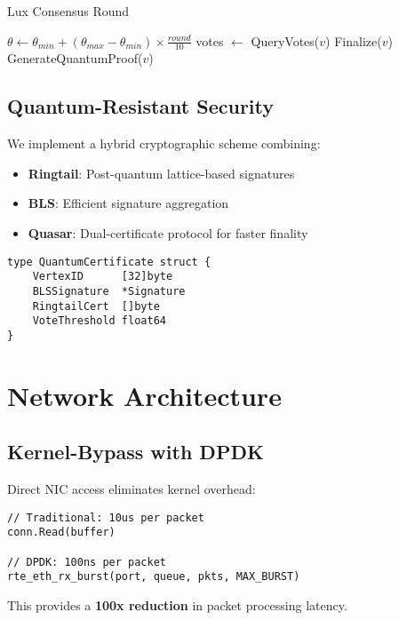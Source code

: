 \documentclass[11pt,a4paper]{article}
\begin{document}
\begin{algorithm}
\caption{Lux Consensus Round}
\begin{algorithmic}
\STATE $\theta \gets \theta_{min} + (\theta_{max} - \theta_{min}) \times \frac{round}{10}$
    \STATE votes $\gets$ QueryVotes($v$)
        \STATE Finalize($v$)
        \STATE GenerateQuantumProof($v$)
    \ENDIF
\ENDFOR
\end{algorithmic}
\end{algorithm}

\subsection{Quantum-Resistant Security}

We implement a hybrid cryptographic scheme combining:

\begin{itemize}
    \item \textbf{Ringtail}: Post-quantum lattice-based signatures
    \item \textbf{BLS}: Efficient signature aggregation
    \item \textbf{Quasar}: Dual-certificate protocol for faster finality
\end{itemize}

\begin{lstlisting}
type QuantumCertificate struct {
    VertexID      [32]byte
    BLSSignature  *Signature
    RingtailCert  []byte
    VoteThreshold float64
}
\end{lstlisting}

\section{Network Architecture}

\subsection{Kernel-Bypass with DPDK}

Direct NIC access eliminates kernel overhead:

\begin{lstlisting}
// Traditional: 10us per packet
conn.Read(buffer)

// DPDK: 100ns per packet
rte_eth_rx_burst(port, queue, pkts, MAX_BURST)
\end{lstlisting}

This provides a \textbf{100x reduction} in packet processing latency.
\end{document}
